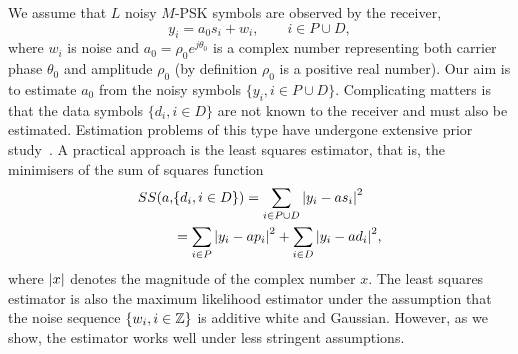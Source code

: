 \documentclass[draftcls, onecolumn, 11pt]{IEEEtran}
\begin{document}
We assume that %
$L$ noisy $M$-PSK symbols are observed by the receiver,  %
\begin{equation}\label{eq:sigmod}
y_i = a_0 s_i + w_i, \qquad i \in P \cup D,
\end{equation}
where $w_i$ is noise and $a_0 = \rho_0 e^{j\theta_0}$ is a complex number representing both carrier phase $\theta_0$ and amplitude $\rho_0$ (by definition $\rho_0$ is a positive real number).  Our aim is to estimate $a_0$ from the noisy symbols $\{ y_i, i \in P \cup D \}$.  Complicating matters is that the data symbols $\{d_i, i \in D\}$ are not known to the receiver and must also be estimated.  Estimation problems of this type have undergone extensive prior study~\cite{ViterbiViterbi_phase_est_1983,Cowley_ref_sym_carr_1998,Wilson1989,Makrakis1990,Liu1991,Mackenthun1994,Sweldens2001,McKilliamLinearTimeBlockPSK2009,Divsalar1990}.  A practical approach is the least squares estimator, that is, the minimisers of the sum of squares function
\begin{equation}\label{eq:SSdefn}
\begin{split}
SS(a, &\{d_i, i \in D\}) = \sum_{i \in P \cup D} {\left\vert  y_i - a s_i  \right\vert}^2  \\
&= \sum_{i \in P} {\left\vert  y_i - a p_i  \right\vert}^2 + \sum_{i \in D} {\left\vert  y_i - a d_i  \right\vert}^2,
\end{split}
\end{equation}
where ${\left\vert x \right\vert}$ denotes the magnitude of the complex number $x$.  The least squares estimator is also the maximum likelihood estimator under the assumption that the noise sequence $\{w_i, i \in {\mathbb Z}\}$ is additive white and Gaussian.  However, as we show, the estimator works well under less stringent assumptions.  %
\end{document}
